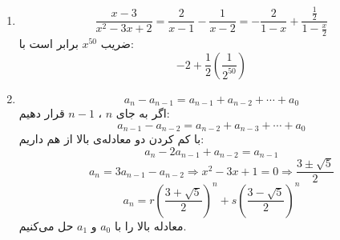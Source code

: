 \p
\begin{enumerate}
\item
$$\frac{x - 3}{x^2 - 3x + 2} = \frac{2}{x - 1} - \frac{1}{x - 2} = -\frac{2}{1 - x} + \frac{\frac{1}{2}}{1 - \frac{x}{2}}$$
ضریب
$x^{50}$
برابر است با:
$$-2 + \frac{1}{2}(\frac{1}{2^{50}})$$
\item
$$a_n - a_{n-1} = a_{n-1} + a_{n-2} + \cdots + a_0$$
اگر به جای
$n$
،
$n - 1$
قرار دهیم:
$$a_{n-1} - a_{n-2} = a_{n-2} + a_{n-3} + \cdots + a_0$$
با کم کردن دو معادله‌ی بالا از هم داریم:
$$a_n - 2a_{n-1} + a_{n-2} = a_{n-1}$$
$$a_n = 3a_{n-1} - a_{n-2} \Rightarrow x^2 - 3x + 1 = 0 \Rightarrow \frac{3 \pm \sqrt{5}}{2}$$
$$a_n = r(\frac{3 + \sqrt{5}}{2})^n + s(\frac{3 - \sqrt{5}}{2})^n$$
معادله بالا را با
$a_0$
و
$a_1$
حل می‌کنیم.
\end{enumerate}
